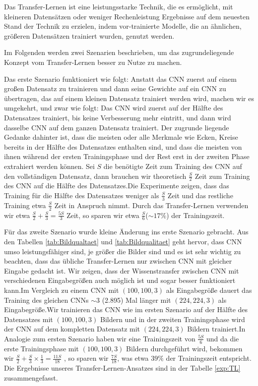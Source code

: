 \documentclass[12pt,a4paper]{scrartcl}
\numberwithin{equation}{section}
\begin{document}
Das Transfer-Lernen ist eine leistungsstarke Technik, die es ermöglicht, mit kleineren Datensätzen oder weniger Rechenleistung Ergebnisse auf dem neuesten Stand der Technik zu erzielen, indem vor-trainierte Modelle, die an ähnlichen, größeren Datensätzen trainiert wurden, genutzt werden.

Im Folgenden werden zwei Szenarien beschrieben, um das zugrundeliegende Konzept vom Transfer-Lernen besser zu Nutze zu machen. 

Das erste Szenario funktioniert wie folgt:
Anstatt das CNN zuerst auf einem großen Datensatz zu trainieren und dann seine Gewichte auf ein CNN zu übertragen, das auf einem kleinen Datensatz trainiert werden wird, machen wir es umgekehrt, und zwar wie folgt: Das CNN wird zuerst auf der Hälfte des Datensatzes trainiert, bis keine Verbesserung mehr eintritt, und dann wird dasselbe CNN auf dem ganzen Datensatz trainiert. Der zugrunde liegende Gedanke dahinter ist, dass die meisten oder alle Merkmale wie Ecken, Kreise bereits in der Hälfte des Datensatzes enthalten sind, und dass die meisten von ihnen während der ersten Trainingsphase und der Rest erst in der zweiten Phase extrahiert werden können. Sei $ S $ die benötigte Zeit zum Training des \ac{CNN} auf den vollständigen Datensatz, dann brauchen wir theoretisch $ \frac{S}{2} $ Zeit  zum Training des CNN auf die Hälfte des Datensatzes.Die Experimente zeigen, dass das Training für die Hälfte des Datensatzes weniger als $ \frac{S}{3} $ Zeit  und das restliche Training etwa $ \frac{S}{2} $ Zeit in Anspruch nimmt. Durch das Transfer-Lernen verwenden wir etwa $ \frac{S}{2} + \frac{S}{3}= \frac{5S}{3} $ Zeit, so sparen wir etwa $ \frac{S}{6} $($\sim 17\%$) der Trainingszeit.

Für das zweite Szenario wurde kleine Änderung ins erste Szenario gebracht.	Aus den Tabellen \ref{tab:Bildqualtaet} und \ref{tab:Bildqualitaet} geht hervor, dass CNN umso leistungsfähiger sind, je größer die Bilder sind und es ist sehr wichtig zu beachten, dass das übliche Transfer-Lernen nur zwischen CNN mit gleicher Eingabe gedacht ist. Wir zeigen, dass der Wissenstransfer zwischen CNN mit verschiedenen Eingabegrößen auch möglich ist und sogar besser funktioniert kann.Im Vergleich zu einem \ac{CNN} mit $ (100, 100, 3) $ als Eingabegröße dauert das Training des gleichen CNNs $\sim 3$ (2.895) Mal länger mit $ (224,224,3) $ als Eingabegröße.Wir trainieren das CNN wie im ersten Szenario auf der Hälfte des Datensatzes mit $ (100, 100, 3) $ Bildern und in der zweiten Trainingsphase wird der CNN auf dem kompletten Datensatz mit $ (224, 224, 3) $ Bildern trainiert.In Analogie zum ersten Szenario haben wir eine Trainingszeit von $ \frac{5S}{6} $ und da die erste Trainingsphase mit $ (100, 100, 3) $ Bildern durchgeführt wird, bekommen wir $ \frac{S}{2}+ \frac{S}{3}\times\frac{1}{3} = \frac{11S}{18} $ , so sparen wir $ \frac{7S}{18} $, was etwa $ 39\% $ der Trainingszeit entspricht. Die Ergebnisse unseres Transfer-Lernen-Ansatzes sind in der Tabelle \ref{exp:TL} zusammengefasst.
\end{document}
